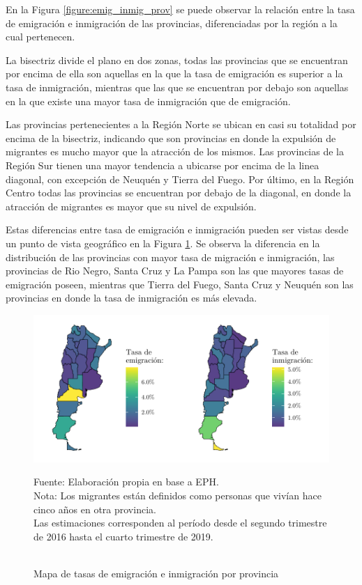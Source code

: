 \documentclass[12pt,a4paper]{article}
\begin{document}
En la Figura \ref{figure:emig_inmig_prov} se puede observar la relación entre la tasa de emigración e inmigración de las provincias, diferenciadas por la región a la cual pertenecen.

La bisectriz divide el plano en dos zonas, todas las provincias que se encuentran por encima de ella son aquellas en la que la tasa de emigración es superior a la tasa de inmigración, mientras que las que se encuentran por debajo son aquellas en la que existe una mayor tasa de inmigración que de emigración. 

Las provincias pertenecientes a la Región Norte se ubican en casi su totalidad por encima de la bisectriz, indicando que son provincias en donde la expulsión de migrantes es mucho mayor que la atracción de los mismos. Las provincias de la Región Sur tienen una mayor tendencia a ubicarse por encima de la linea diagonal, con excepción de Neuquén y Tierra del Fuego. Por último, en la Región Centro todas las provincias se encuentran por debajo de la diagonal, en donde la atracción de migrantes es mayor que su nivel de expulsión.

Estas diferencias entre tasa de emigración e inmigración pueden ser vistas desde un punto de vista geográfico en la Figura \ref{figure:emig_inmig_prov_mapa}. Se observa la diferencia en la distribución de las provincias con mayor tasa de migración e inmigración, las provincias de Rio Negro, Santa Cruz y La Pampa son las que mayores tasas de emigración poseen, mientras que Tierra del Fuego, Santa Cruz y Neuquén son  las provincias en donde la tasa de inmigración es más elevada.
\begin{figure}[htbp!]
\begin{center}
\caption{\\Mapa de tasas de emigración e inmigración por provincia}
\includegraphics[scale=1.1]{./graficos/emig_inmig_por_prov.pdf}
\label{figure:emig_inmig_prov_mapa}
\end{center}
\begin{flushleft}
\begin{scriptsize}
Fuente: Elaboración propia en base a EPH.\\
Nota: Los migrantes están definidos como personas que vivían hace cinco años en otra provincia.\\
Las estimaciones corresponden al período desde el segundo trimestre de 2016 hasta el cuarto trimestre de 2019.\\
\end{scriptsize}
\end{flushleft}
\end{figure}
\newpage
\end{document}
